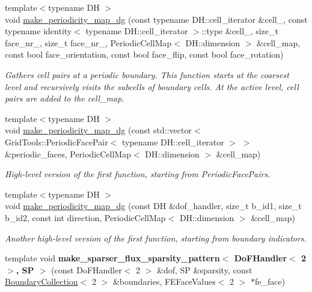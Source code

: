 \begin{DoxyCompactItemize}
\item 
{\footnotesize template$<$typename DH $>$ }\\void \hyperlink{namespacenatrium_1_1DealIIExtensions_a6bc5b9999ee7c47791ea8754f586277e}{make\_\-periodicity\_\-map\_\-dg} (const typename DH::cell\_\-iterator \&cell\_, const typename identity$<$ typename DH::cell\_\-iterator $>$::type \&cell\_, size\_\-t face\_\-nr\_, size\_\-t face\_\-nr\_, PeriodicCellMap$<$ DH::dimension $>$ \&cell\_\-map, const bool face\_\-orientation, const bool face\_\-flip, const bool face\_\-rotation)
\begin{DoxyCompactList}\small\item\em Gathers cell pairs at a periodic boundary. This function starts at the coarsest level and recursively visits the subcells of boundary cells. At the active level, cell pairs are added to the cell\_\-map. \item\end{DoxyCompactList}\item 
{\footnotesize template$<$typename DH $>$ }\\void \hyperlink{namespacenatrium_1_1DealIIExtensions_a02ccc2d5be9d7550b75fa196aeb71656}{make\_\-periodicity\_\-map\_\-dg} (const std::vector$<$ GridTools::PeriodicFacePair$<$ typename DH::cell\_\-iterator $>$ $>$ \&periodic\_\-faces, PeriodicCellMap$<$ DH::dimension $>$ \&cell\_\-map)
\begin{DoxyCompactList}\small\item\em High-\/level version of the first function, starting from PeriodicFacePairs. \item\end{DoxyCompactList}\item 
{\footnotesize template$<$typename DH $>$ }\\void \hyperlink{namespacenatrium_1_1DealIIExtensions_a01f414566020f59f29036fd7e22341b9}{make\_\-periodicity\_\-map\_\-dg} (const DH \&dof\_\-handler, size\_\-t b\_\-id1, size\_\-t b\_\-id2, const int direction, PeriodicCellMap$<$ DH::dimension $>$ \&cell\_\-map)
\begin{DoxyCompactList}\small\item\em Another high-\/level version of the first function, starting from boundary indicators. \item\end{DoxyCompactList}\item 
\hypertarget{namespacenatrium_1_1DealIIExtensions_a1114fe047dc504c301fade5677bcea1d}{
template void {\bfseries make\_\-sparser\_\-flux\_\-sparsity\_\-pattern$<$ DoFHandler$<$ 2 $>$, SP $>$} (const DoFHandler$<$ 2 $>$ \&dof, SP \&sparsity, const \hyperlink{classnatrium_1_1BoundaryCollection}{BoundaryCollection}$<$ 2 $>$ \&boundaries, FEFaceValues$<$ 2 $>$ $\ast$fe\_\-face)}
\label{namespacenatrium_1_1DealIIExtensions_a1114fe047dc504c301fade5677bcea1d}


\end{DoxyCompactItemize}
